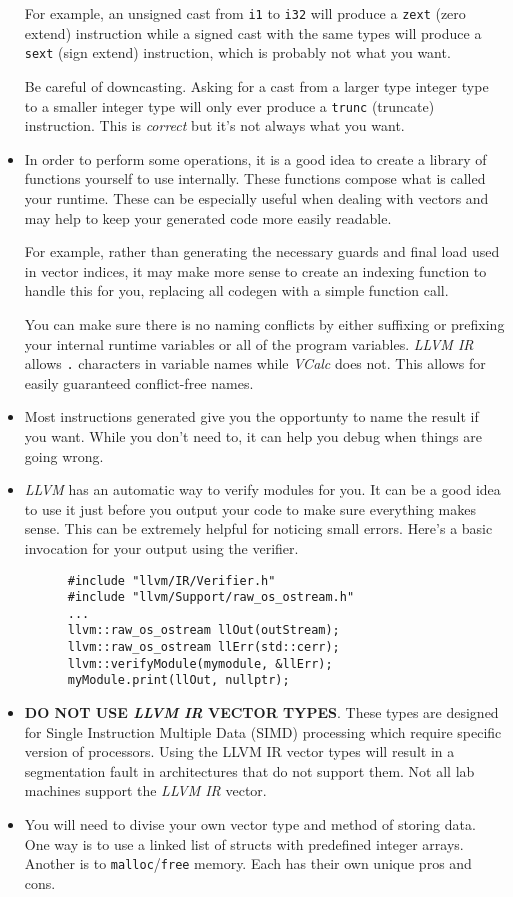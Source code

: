 \documentclass{article}
\newcommand{\code}[1]{\texttt{\textmd{#1}}}
\begin{document}
\begin{itemize}
    For example, an unsigned cast from \code{i1} to \code{i32} will produce a \code{zext} (zero
    extend) instruction while a signed cast with the same types will produce a \code{sext} (sign
    extend) instruction, which is probably not what you want.

    Be careful of downcasting. Asking for a cast from a larger type integer type to a smaller
    integer type will only ever produce a \code{trunc} (truncate) instruction. This is
    \textit{correct} but it's not always what you want.
  \item
    In order to perform some operations, it is a good idea to create a library of functions yourself
    to use internally. These functions compose what is called your runtime. These can be especially
    useful when dealing with vectors and may help to keep your generated code more easily readable.

    For example, rather than generating the necessary guards and final load used in vector indices,
    it may make more sense to create an indexing function to handle this for you, replacing all
    codegen with a simple function call.

    You can make sure there is no naming conflicts by either suffixing or prefixing your internal
    runtime variables or all of the program variables. \textit{LLVM IR} allows \code{.} characters
    in variable names while \textit{VCalc} does not. This allows for easily guaranteed conflict-free
    names.
  \item
    Most instructions generated give you the opportunty to name the result if you want. While you
    don't need to, it can help you debug when things are going wrong.
  \item
    \textit{LLVM} has an automatic way to verify modules for you. It can be a good idea to use it
    just before you output your code to make sure everything makes sense. This can be extremely
    helpful for noticing small errors. Here's a basic invocation for your output using the verifier.
    \begin{lstlisting}
      #include "llvm/IR/Verifier.h"
      #include "llvm/Support/raw_os_ostream.h"
      ...
      llvm::raw_os_ostream llOut(outStream);
      llvm::raw_os_ostream llErr(std::cerr);
      llvm::verifyModule(mymodule, &llErr);
      myModule.print(llOut, nullptr);
    \end{lstlisting}
  \item
    \textbf{DO NOT USE \textit{LLVM IR} VECTOR TYPES}. These types are designed for Single
    Instruction Multiple Data (SIMD) processing which require specific version of processors. Using
    the LLVM IR vector types will result in a segmentation fault in architectures that do not
    support them. Not all lab machines support the \textit{LLVM IR} vector.
  \item
    You will need to divise your own vector type and method of storing data. One way is to use a
    linked list of structs with predefined integer arrays. Another is to \code{malloc}/\code{free}
    memory. Each has their own unique pros and cons.
\end{itemize}
\end{document}
